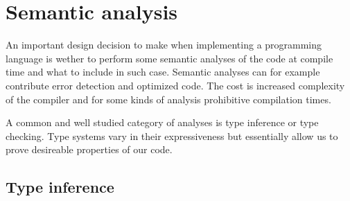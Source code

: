\section{Semantic analysis}

An important design decision to make when implementing a programming language is wether to perform some semantic analyses of the code at compile time and what to include in such case. Semantic analyses can for example contribute error detection and optimized code. The cost is increased complexity of the compiler and for some kinds of analysis prohibitive compilation times.

A common and well studied category of analyses is type inference or type checking. Type systems vary in their expressiveness but essentially allow us to prove desireable properties of our code.



\subsection{Type inference}









